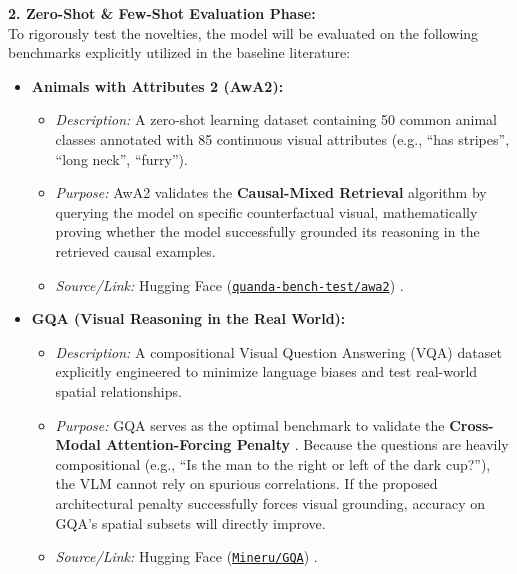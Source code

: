 \documentclass[11pt, letterpaper]{article}
\begin{document}
\textbf{2. Zero-Shot \& Few-Shot Evaluation Phase:}\\
To rigorously test the novelties, the model will be evaluated on the following benchmarks explicitly utilized in the baseline literature:
\begin{itemize}[noitemsep, topsep=2pt]
    \item \textbf{Animals with Attributes 2 (AwA2):}
    \begin{itemize}[noitemsep]
        \item \textit{Description:} A zero-shot learning dataset containing 50 common animal classes annotated with 85 continuous visual attributes (e.g., ``has stripes'', ``long neck'', ``furry'').
        \item \textit{Purpose:} AwA2 validates the \textbf{Causal-Mixed Retrieval} algorithm by querying the model on specific counterfactual visual, mathematically proving whether the model successfully grounded its reasoning in the retrieved causal examples.
        \item \textit{Source/Link:} Hugging Face (\href{https://huggingface.co/datasets/quanda-bench-test/awa2}{\texttt{quanda-bench-test/awa2}}) \cite{xian2018zero}.
    \end{itemize}

    \item \textbf{GQA (Visual Reasoning in the Real World):}
    \begin{itemize}[noitemsep]
        \item \textit{Description:} A compositional Visual Question Answering (VQA) dataset explicitly engineered to minimize language biases and test real-world spatial relationships.
        \item \textit{Purpose:} GQA serves as the optimal benchmark to validate the \textbf{Cross-Modal Attention-Forcing Penalty} \cite{chen2024understanding}. Because the questions are heavily compositional (e.g., ``Is the man to the right or left of the dark cup?''), the VLM cannot rely on spurious correlations. If the proposed architectural penalty successfully forces visual grounding, accuracy on GQA's spatial subsets will directly improve.
        \item \textit{Source/Link:} Hugging Face (\href{https://huggingface.co/datasets/Mineru/GQA}{\texttt{Mineru/GQA}}) \cite{hudson2019gqa}.
    \end{itemize}
\end{itemize}
\end{document}
